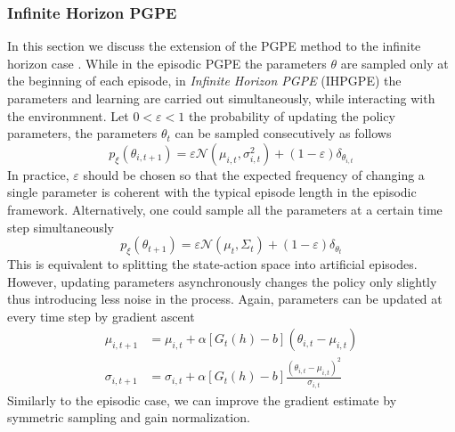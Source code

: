 \subsubsection{Infinite Horizon PGPE}
In this section we discuss the extension of the PGPE method to the infinite
horizon case \cite{sehnke2012parameter}. While in the episodic PGPE the
parameters $\theta$ are sampled only at the beginning of each episode, in
\emph{Infinite Horizon PGPE} (IHPGPE) the parameters and learning are carried 
out simultaneously, while interacting with the environmnent. Let $0 <
\varepsilon < 1$ the probability of updating the policy parameters, the 
parameters $\theta_t$ can be sampled consecutively as follows
\begin{equation}
	p_\xi(\theta_{i,t+1}) = \varepsilon \mathcal{N}(\mu_{i,t}, \sigma_{i,t}^2) 
							+ (1-\varepsilon) \delta_{\theta_{i,t}}
\end{equation}
In practice, $\varepsilon$ should be chosen so that the expected frequency of
changing a single parameter is coherent with the typical episode length in the
episodic framework. Alternatively, one could sample all the parameters at a
certain time step simultaneously
\begin{equation}
	p_\xi(\theta_{t+1}) = \varepsilon \mathcal{N}(\mu_{t}, \Sigma_t) 
							+ (1-\varepsilon) \delta_{\theta_{t}}
\end{equation}
This is equivalent to splitting the state-action space into artificial
episodes. However, updating parameters asynchronously changes the policy only
slightly thus introducing less noise in the process. Again, parameters can be
updated at every time step by gradient ascent
\begin{equation}
	\begin{split}
		\mu_{i,t+1} &= \mu_{i,t} + \alpha \left[G_t(h) - b\right] (\theta_{i,t}
		- \mu_{i,t})\\
		\sigma_{i,t+1} &= \sigma_{i,t} + \alpha \left[G_t(h) - b\right] 
		\frac{(\theta_{i,t} -\mu_{i,t})^2}{\sigma_{i,t}}
	\end{split}
\end{equation}
Similarly to the episodic case, we can improve the gradient estimate by
symmetric sampling and gain normalization. 